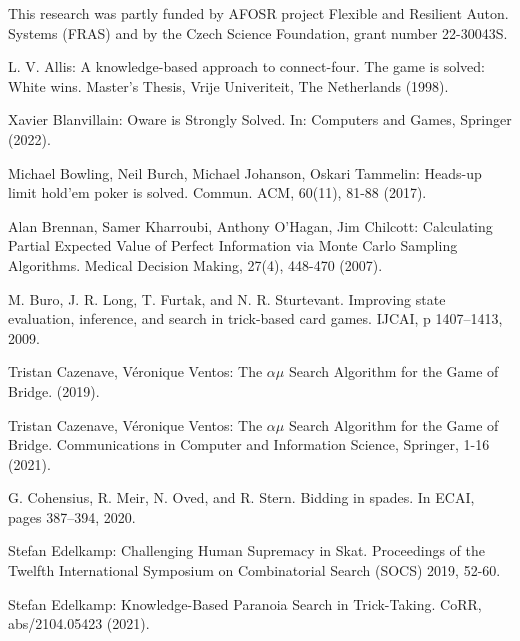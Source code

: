 \documentclass[runningheads]{llncs}
\begin{document}
This research was partly funded by AFOSR project Flexible and Resilient Auton. Systems (FRAS) and by the Czech Science Foundation, grant number 22-30043S.
%
%
%
% 
% 
%
\begin{thebibliography}{8}

    L. V. Allis: A knowledge-based approach to connect-four. The game is solved: White wins. Master's Thesis, Vrije Univeriteit, The Netherlands (1998).

    Xavier Blanvillain: Oware is Strongly Solved. In: Computers and Games, Springer (2022).

    Michael Bowling, Neil Burch, Michael Johanson, Oskari Tammelin: Heads-up limit hold'em poker is solved. Commun. ACM, 60(11), 81-88 (2017).

    Alan Brennan, Samer Kharroubi, Anthony O'Hagan, Jim Chilcott: Calculating Partial Expected Value of Perfect Information via Monte Carlo Sampling Algorithms. Medical Decision Making, 27(4), 448-470 (2007).

    M. Buro, J. R. Long, T. Furtak, and N. R. Sturtevant. Improving state evaluation, inference, and search in trick-based card games. IJCAI, p 1407–1413, 2009.

    Tristan Cazenave, Véronique Ventos: The $\alpha\mu$ Search Algorithm for the Game of Bridge. (2019).

    Tristan Cazenave, Véronique Ventos: The $\alpha\mu$ Search Algorithm for the Game of Bridge. Communications in Computer and Information Science, Springer, 1-16 (2021).

    G. Cohensius, R. Meir, N. Oved, and R. Stern. Bidding in spades. In ECAI, pages 387–394, 2020.

    Stefan Edelkamp: Challenging Human Supremacy in Skat. Proceedings of the Twelfth International Symposium on Combinatorial Search (SOCS) 2019, 52-60.

    Stefan Edelkamp: Knowledge-Based Paranoia Search in Trick-Taking. CoRR, abs/2104.05423 (2021).


\end{thebibliography}
\end{document}
